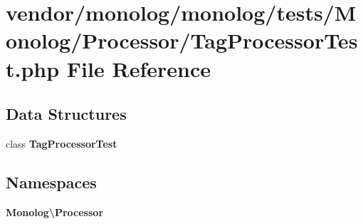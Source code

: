 \section{vendor/monolog/monolog/tests/\+Monolog/\+Processor/\+Tag\+Processor\+Test.php File Reference}
\label{_tag_processor_test_8php}
\subsection*{Data Structures}
\begin{DoxyCompactItemize}
\item 
class {\bf Tag\+Processor\+Test}
\end{DoxyCompactItemize}
\subsection*{Namespaces}
\begin{DoxyCompactItemize}
\item 
 {\bf Monolog\textbackslash{}\+Processor}
\end{DoxyCompactItemize}
